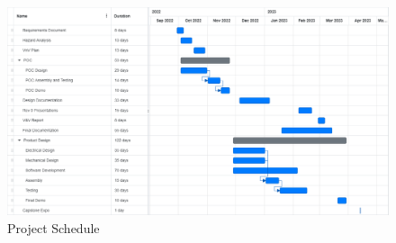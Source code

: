 \documentclass[titlepage]{article}
\begin{document}
\begin{figure} [H]
\begin{center}
	\includegraphics [width=1\textwidth] {Figures/Gantt.pdf}
	\caption{Project Schedule}
	\label{fig:Gantt}
	\end{center}
\end{figure}
\end{document}
